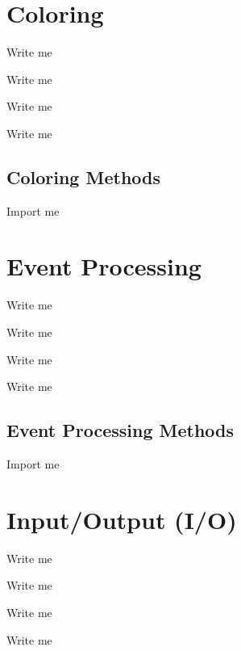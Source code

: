 \documentclass[letterpaper,10pt,english]{sphinxmanual}
\begin{document}
\section{Coloring}
\label{\detokenize{Sub-Packages:coloring}}\label{\detokenize{Sub-Packages:coloring-module}}
\begin{DUlineblock}{0em}
\item[] Write me
\item[] Write me
\item[] Write me
\item[] Write me
\end{DUlineblock}


\subsection{Coloring Methods}
\label{\detokenize{Sub-Packages:coloring-methods}}
\begin{DUlineblock}{0em}
\item[] Import me
\end{DUlineblock}


\section{Event Processing}
\label{\detokenize{Sub-Packages:event-processing}}\label{\detokenize{Sub-Packages:event-processing-module}}
\begin{DUlineblock}{0em}
\item[] Write me
\item[] Write me
\item[] Write me
\item[] Write me
\end{DUlineblock}


\subsection{Event Processing Methods}
\label{\detokenize{Sub-Packages:event-processing-methods}}
\begin{DUlineblock}{0em}
\item[] Import me
\end{DUlineblock}


\section{Input/Output (I/O)}
\label{\detokenize{Sub-Packages:input-output-i-o}}\label{\detokenize{Sub-Packages:io-module}}
\begin{DUlineblock}{0em}
\item[] Write me
\item[] Write me
\item[] Write me
\item[] Write me
\end{DUlineblock}
\end{document}
